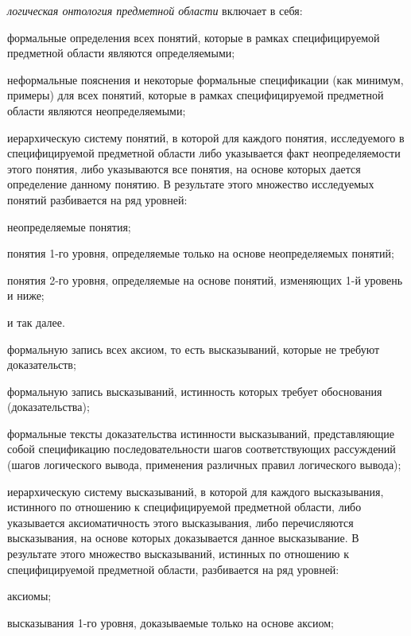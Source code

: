 \textit{логическая онтология предметной области} включает в себя:
\begin{textitemize}
	\item формальные определения всех понятий, которые в рамках специфицируемой предметной области являются определяемыми;
	\item неформальные пояснения и некоторые формальные спецификации (как минимум, примеры) для всех понятий, которые в рамках специфицируемой предметной области являются неопределяемыми;
	\item иерархическую систему понятий, в которой для каждого понятия, исследуемого в специфицируемой предметной области либо указывается факт неопределяемости этого понятия, либо указываются все понятия, на основе которых дается определение данному понятию.
	В результате этого множество исследуемых понятий разбивается на ряд уровней: 
	\begin{textitemize}
		\item неопределяемые понятия;
		\item понятия 1-го уровня, определяемые только на основе неопределяемых понятий;
		\item понятия 2-го уровня, определяемые на основе понятий, изменяющих 1-й уровень и ниже;
		\item и так далее.
	\end{textitemize}
	\item формальную запись всех аксиом, то есть высказываний, которые не требуют доказательств;
	\item формальную запись высказываний, истинность которых требует обоснования (доказательства);
	\item формальные тексты доказательства истинности высказываний, представляющие собой спецификацию последовательности шагов соответствующих рассуждений (шагов логического вывода, применения различных правил логического вывода);
	\item иерархическую систему высказываний, в которой для каждого высказывания, истинного по отношению к специфицируемой предметной области, либо указывается аксиоматичность этого высказывания, либо перечисляются  высказывания, на основе которых доказывается данное высказывание. В результате этого множество высказываний, истинных по отношению к специфицируемой предметной области, разбивается на ряд уровней:
	\begin{textitemize}
		\item аксиомы;
		\item высказывания 1-го уровня, доказываемые только на основе аксиом;

\end{textitemize}
\end{textitemize}
